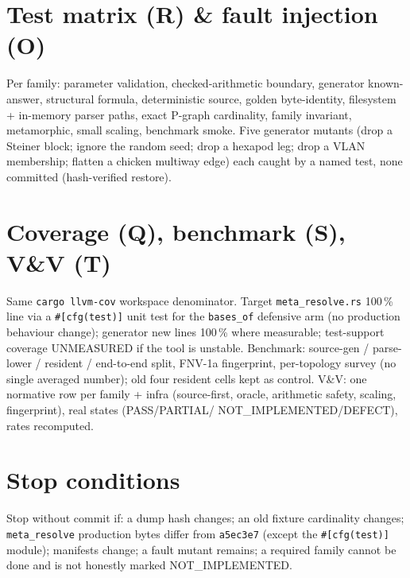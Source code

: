 \documentclass[11pt]{article}
\begin{document}
\section{Test matrix (R) \& fault injection (O)}
Per family: parameter validation, checked-arithmetic boundary, generator
known-answer, structural formula, deterministic source, golden byte-identity,
filesystem + in-memory parser paths, exact P-graph cardinality, family invariant,
metamorphic, small scaling, benchmark smoke. Five generator mutants (drop a
Steiner block; ignore the random seed; drop a hexapod leg; drop a VLAN
membership; flatten a chicken multiway edge) each caught by a named test, none
committed (hash-verified restore).

\section{Coverage (Q), benchmark (S), V\&V (T)}
Same \texttt{cargo llvm-cov} workspace denominator. Target \texttt{meta\_resolve.rs}
100\,\% line via a \texttt{\#[cfg(test)]} unit test for the \texttt{bases\_of}
defensive arm (no production behaviour change); generator new lines 100\,\% where
measurable; test-support coverage UNMEASURED if the tool is unstable. Benchmark:
source-gen / parse-lower / resident / end-to-end split, FNV-1a fingerprint,
per-topology survey (no single averaged number); old four resident cells kept as
control. V\&V: one normative row per family + infra (source-first, oracle,
arithmetic safety, scaling, fingerprint), real states (PASS/PARTIAL/%
NOT\_IMPLEMENTED/DEFECT), rates recomputed.

\section{Stop conditions}
Stop without commit if: a dump hash changes; an old fixture cardinality changes;
\texttt{meta\_resolve} production bytes differ from \texttt{a5ec3e7} (except the
\texttt{\#[cfg(test)]} module); manifests change; a fault mutant remains; a
required family cannot be done and is not honestly marked NOT\_IMPLEMENTED.
\end{document}

